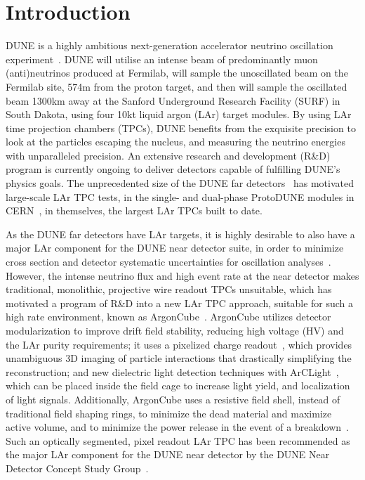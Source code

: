 \section{Introduction}
\label{sec:introduction}

DUNE is a highly ambitious next-generation accelerator neutrino oscillation experiment~\cite{DUNE, DUNE2}. DUNE will utilise an intense beam of predominantly muon (anti)neutrinos produced at Fermilab, will sample the unoscillated beam on the Fermilab site, 574m from the proton target, and then will sample the oscillated beam 1300km away at the Sanford Underground Research Facility (SURF) in South Dakota, using four 10kt liquid argon (LAr) target modules. By using LAr time projection chambers (TPCs), DUNE benefits from the exquisite precision to look at the particles escaping the nucleus, and measuring the neutrino energies with unparalleled precision. An extensive research and development (R\&D) program is currently ongoing to deliver detectors capable of fulfilling DUNE's physics goals. The unprecedented size of the DUNE far detectors~\cite{DUNE_IDR_v1, DUNE_IDR_v2, DUNE_IDR_v3} has motivated large-scale LAr TPC tests, in the single- and dual-phase ProtoDUNE modules in CERN~\cite{Abi:2017aow, Agostino:2014qoa}, in themselves, the largest LAr TPCs built to date.

As the DUNE far detectors have LAr targets, it is highly desirable to also have a major LAr component for the DUNE near detector suite, in order to minimize cross section and detector systematic uncertainties for oscillation analyses~\cite{DUNE, DUNE2}. However, the intense neutrino flux and high event rate at the near detector makes traditional, monolithic, projective wire readout TPCs unsuitable, which has motivated a program of R\&D into a new LAr TPC approach, suitable for such a high rate environment, known as ArgonCube~\cite{argoncube_loi}. ArgonCube utilizes detector modularization to improve drift field stability, reducing high voltage (HV) and the LAr purity requirements; it uses a pixelized charge readout~\cite{pixels, larpix}, which provides unambiguous 3D imaging of particle interactions that drastically simplifying the reconstruction; and new dielectric light detection techniques with ArCLight~\cite{arclight}, which can be placed inside the field cage to increase light yield, and localization of light signals. Additionally, ArgonCube uses a resistive field shell, instead of traditional field shaping rings, to minimize the dead material and maximize active volume, and to minimize the power release in the event of a breakdown~\addcite. Such an optically segmented, pixel readout LAr TPC has been recommended as the major LAr component for the DUNE near detector by the DUNE Near Detector Concept Study Group~\cite{dune_ndcsg}.

